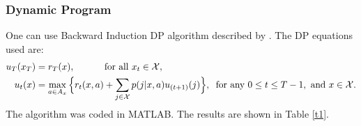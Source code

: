 \documentclass[11pt,a4paper,oneside]{report}
\begin{document}
\subsubsection{Dynamic Program}
One can use Backward Induction DP algorithm described by \citep{puterman1990market}. The DP equations used are:
\begin{align}
u_T(x_T)&=r_T(x),\hspace{1cm} \text{ for all } x_t\in \mathcal{X}, \\
u_t(x)&=\max_{a\in A_{x}}\Big\lbrace r_t(x,a) + \sum_{j\in {\mathcal{X}}} p(j|x,a)u_{(t+1)}(j)\Big\rbrace, \hspace{0.2cm} \text{for any } 0\leq t\leq T-1, \text{ and } x\in \mathcal{X}. \nonumber
\end{align}
The algorithm was coded in MATLAB. The results are shown in Table \ref{t1}. 
\end{document}
